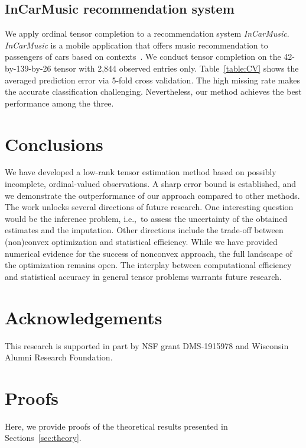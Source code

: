 \documentclass{article}
\theoremstyle{plain}
\theoremstyle{definition}
\begin{document}
\subsection{InCarMusic recommendation system}
We apply ordinal tensor completion to a recommendation system {\it InCarMusic}. {\it InCarMusic} is a mobile application that offers music recommendation to passengers of cars based on contexts~\cite{baltrunas2011incarmusic}. We conduct tensor completion on the 42-by-139-by-26 tensor with 2,844 observed entries only. Table~\ref{table:CV} shows the averaged prediction error via 5-fold cross validation. The high missing rate makes the accurate classification challenging. Nevertheless, our method achieves the best performance among the three.

\section{Conclusions}
We have developed a low-rank tensor estimation method based on possibly incomplete, ordinal-valued observations. A sharp error bound is established, and we demonstrate the outperformance of our approach compared to other methods. The work unlocks several directions of future research. One interesting question would be the inference problem, i.e.,\ to assess the uncertainty of the obtained estimates and the imputation. Other directions include the trade-off between (non)convex optimization and statistical efficiency. While we have provided numerical evidence for the success of nonconvex approach, the full landscape of the optimization remains open. The interplay between computational efficiency and statistical accuracy in general tensor problems warrants future research.

\newpage
\section*{Acknowledgements}
This research is supported in part by NSF grant DMS-1915978 and Wisconsin Alumni Research Foundation.





\clearpage
\appendix
\onecolumn




\section{Proofs}\label{sec:proof}
Here, we provide proofs of the theoretical results presented in Sections~\ref{sec:theory}.
\end{document}
